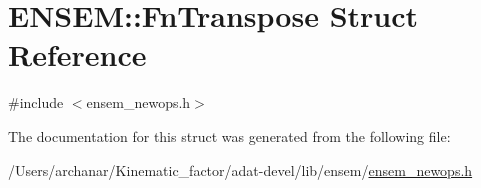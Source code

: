 \hypertarget{structENSEM_1_1FnTranspose}{}\section{E\+N\+S\+EM\+:\+:Fn\+Transpose Struct Reference}
\label{structENSEM_1_1FnTranspose}


{\ttfamily \#include $<$ensem\+\_\+newops.\+h$>$}



The documentation for this struct was generated from the following file\+:\begin{DoxyCompactItemize}
\item 
/\+Users/archanar/\+Kinematic\+\_\+factor/adat-\/devel/lib/ensem/\mbox{\hyperlink{adat-devel_2lib_2ensem_2ensem__newops_8h}{ensem\+\_\+newops.\+h}}\end{DoxyCompactItemize}
